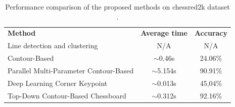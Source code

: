\begin{table}[ht]
\centering
\caption{Performance comparison of the proposed methods on chessred2k dataset \cite{cpd:dataset:chessred2k}.}
\label{chessboard:table:comparison}
\begin{tabular}{lcc}
\textbf{Method} & \textbf{Average time} & \textbf{Accuracy} \\
Line detection and clustering & N/A & N/A \\
Contour-Based & $\sim$0.46s & 24.06\% \\
Parallel Multi-Parameter Contour-Based & $\sim$5.154s & 90.91\% \\
Deep Learning Corner Keypoint & $\sim$0.013s & 45,04\% \\
Top-Down Contour-Based Chessboard & $\sim$0.312s & 92.16\% \\
\end{tabular}
\end{table}
 